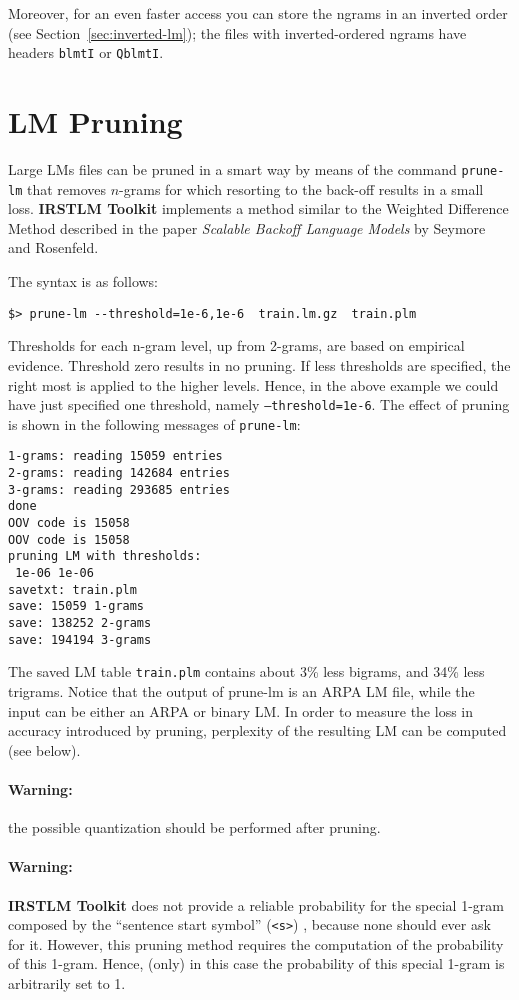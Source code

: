 \documentclass[11pt]{article}
\newcommand{\IRSTLM}{{\bf IRSTLM Toolkit}}
\begin{document}
\noindent
Moreover, for an even faster access you can store the ngrams in an inverted
order (see Section~\ref{sec:inverted-lm});
the files with inverted-ordered ngrams have headers  {\tt blmtI} or {\tt QblmtI}.

\newpage
\section{LM Pruning}
Large LMs files can be pruned in a smart way by means of the command 
{\tt prune-lm} that removes $n$-grams for which resorting to the back-off 
results in a small loss. {\IRSTLM} implements a method similar to the 
Weighted Difference Method described in the paper {\em Scalable Backoff
Language Models} by Seymore and Rosenfeld.

\noindent
The syntax is as follows:
\begin{verbatim}
$> prune-lm --threshold=1e-6,1e-6  train.lm.gz  train.plm
\end{verbatim}
Thresholds for each n-gram level, up from 2-grams, are based on empirical 
evidence. Threshold zero results in no pruning. If less thresholds are specified,
the right most is applied to the higher levels. Hence, in the above example we
could have just specified one threshold, namely {\tt --threshold=1e-6}. 
The effect of pruning is shown in the following messages of {\tt prune-lm}:

\begin{verbatim}1-grams: reading 15059 entries
2-grams: reading 142684 entries
3-grams: reading 293685 entries
done
OOV code is 15058
OOV code is 15058
pruning LM with thresholds: 
 1e-06 1e-06
savetxt: train.plm
save: 15059 1-grams
save: 138252 2-grams
save: 194194 3-grams
\end{verbatim}

\noindent
The saved LM table {\tt train.plm}  contains about 3\% less bigrams, and 34\%  
less trigrams.
Notice that the output of prune-lm is an ARPA LM file, while the input can be 
either an ARPA or binary LM. 
In order to measure the loss in accuracy introduced
by pruning, perplexity of the resulting LM can be computed (see below).

\paragraph{Warning:} the possible quantization should be performed after pruning.

\paragraph{Warning:} 
{\IRSTLM} does not provide a reliable probability for the special
1-gram composed by the ``sentence start symbol'' ({\tt <s>}) , because none
should ever ask for it.  However, this pruning method requires the
computation of the probability of this 1-gram.  Hence, (only) in this case
the probability of this special 1-gram is arbitrarily set to 1.
\end{document}
